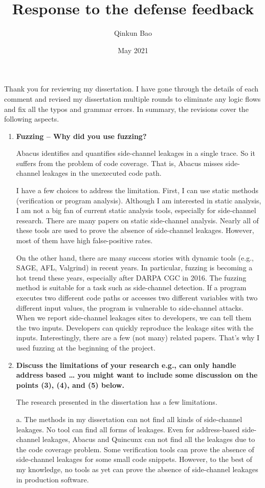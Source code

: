 \documentclass{article}
\title{Response to the defense feedback}
\author{Qinkun Bao}
\date{May 2021}
\begin{document}
\maketitle
Thank you for reviewing my dissertation. I have gone through the details of each comment and revised my dissertation multiple rounds to eliminate any logic flows and fix all the typos and grammar errors. In summary, the revisions cover the following aspects.


\begin{enumerate}
\item \textbf{Fuzzing – Why did you use fuzzing?}

Abacus identifies and quantifies side-channel leakages in a single trace. So it suffers from the problem of code coverage.  That is, Abacus misses side-channel leakages in the unexecuted code path. 

I have a few choices to address the limitation. First, I can use static methods (verification or program analysis). Although I am interested in static analysis, I am not a big fan of current static analysis tools, especially for side-channel research. There are many papers on static side-channel analysis. Nearly all of these tools are used to prove the absence of side-channel leakages. However, most of them have high false-positive rates. 

On the other hand, there are many success stories with dynamic tools (e.g., SAGE, AFL, Valgrind) in recent years. In particular, fuzzing is becoming a hot trend these years, especially after DARPA CGC in 2016. The fuzzing method is suitable for a task such as side-channel detection. If a program executes two different code paths or accesses two different variables with two different input values, the program is vulnerable to side-channel attacks. When we report side-channel leakages sites to developers, we can tell them the two inputs. Developers can quickly reproduce the leakage sites with the inputs.  Interestingly, there are a few (not many) related papers. That's why I used fuzzing at the beginning of the project.


\item \textbf{Discuss the limitations of your research
e.g., can only handle address based …
you might want to include some discussion on the points (3), (4), and (5) below.}

The research presented in the dissertation has a few limitations.

a. The methods in my dissertation can not find all kinds of side-channel leakages. No tool can find all forms of leakages. Even for address-based side-channel leakages, Abacus and Quincunx can not find all the leakages due to the code coverage problem. Some verification tools can prove the absence of side-channel leakages for some small code snippets. However, to the best of my knowledge, no tools as yet can prove the absence of side-channel leakages in production software.


\end{enumerate}
\end{document}
